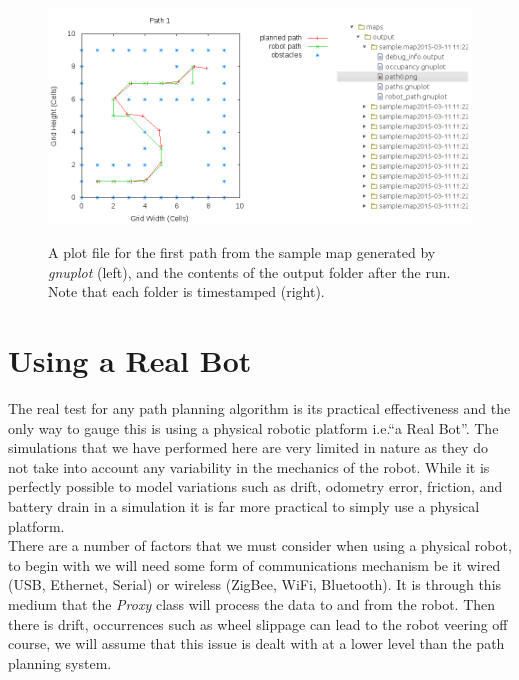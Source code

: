 \begin{figure}[htbp]

\center \includegraphics[width=435pt]{illustrations/sample_output_2}\\
\caption{A plot file for the first path from the sample map generated by \textit{gnuplot} (left), and the contents of the output folder after the run. Note that each folder is timestamped (right).} 
\label{sample_output}

\end{figure}

\newpage


\section{Using a Real Bot}
\noindent
The real test for any path planning algorithm is its practical effectiveness \cite{FIELD} and the only way to gauge this is using a physical robotic platform i.e.``a Real Bot''. The simulations that we have performed here are very limited in nature as they do not take into account any variability in the mechanics of the robot. While it is perfectly possible to model variations such as drift, odometry error, friction, and battery drain in a simulation it is far more practical to simply use a physical platform.  \\
  
\noindent
There are a number of factors that we must consider when using a physical robot, to begin with we will need some form of communications mechanism be it wired (USB, Ethernet, Serial) or wireless (ZigBee, WiFi, Bluetooth). It is through this medium that the \textit{Proxy} class will process the data to and from the robot. Then there is drift, occurrences such as wheel slippage can lead to the robot veering off course, we will assume that this issue is dealt with at a lower level than the path planning system.

